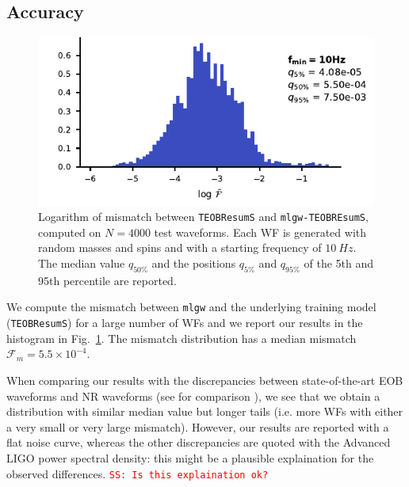 \documentclass[twocolumn,showpacs,preprintnumbers,nofootinbib,prd,
superscriptaddress,10pt]{revtex4-1}
\newcommand{\sschmidt}[1]{{\textcolor{red}{\texttt{SS: #1}} }}
\begin{document}
\subsection{Accuracy}
\begin{figure}
	\centering
    \includegraphics[width=\linewidth]{img/F_hist.pdf}
	\caption{Logarithm of mismatch between \texttt{TEOBResumS} and \texttt{mlgw-TEOBREsumS}, computed on $N=4000$ test waveforms. 
	Each WF is generated with random masses and spins and with a starting frequency of $\SI{10}{Hz}$.
	The median value $q_{50\%}$ and the positions $q_{5\%}$ and $q_{95\%}$ of the 5th and 95th percentile are reported.
}
	\label{fig:F_hist}
\end{figure}
We compute the mismatch between \texttt{mlgw} and the underlying training model (\texttt{TEOBResumS}) for a large number of WFs
and we report our results in the histogram in Fig.~\ref{fig:F_hist}. The mismatch distribution has 
a median mismatch ${\mathcal{F}_m = 5.5 \times {10^{-4}}}$.

When comparing our results with the discrepancies between state-of-the-art EOB waveforms and NR waveforms (see for comparison \cite{Bohe:2016gbl, Nagar:2020pcj}), we see that we obtain a distribution with similar median value but longer tails (i.e. more WFs with either a very small or very large mismatch). However, our results are reported with a flat noise curve, whereas the other discrepancies are quoted with the Advanced LIGO power spectral density: this might be a plausible explaination for the observed differences.
\sschmidt{Is this explaination ok?}
\end{document}

